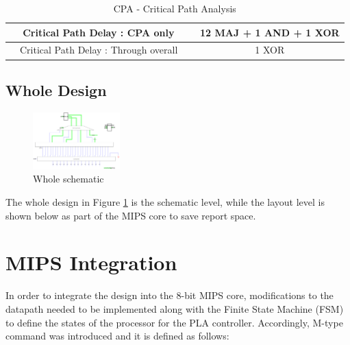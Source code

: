 \documentclass[journal]{IEEEtran}
\begin{document}
\vspace{-10pt}

\begin{table}[!h]
\renewcommand{\arraystretch}{1.5}
\caption{CPA - Critical Path Analysis}
\label{tab:t6}
\centering
\begin{tabular}{|c|c|}
\hline
~~Critical Path Delay : CPA only ~~ & 12 MAJ + 1 AND + 1 XOR\\\hline
~~Critical Path Delay : Through overall ~~ & 1 XOR\\\hline
\end{tabular}
\end{table}

\vspace{-10pt}


\subsection{Whole Design}

\begin{figure}[h!]
  \centering
  \includegraphics[width=0.3\textwidth]{9.png}
  \centering
  \caption{Whole schematic}
  \label{fig:9}
\end{figure}


The whole design in Figure \ref{fig:9} is the schematic level, while the layout level is shown below as part of the MIPS core to save report space.


\section{MIPS Integration}

In order to integrate the design into the 8-bit MIPS core, modifications to the datapath needed to be implemented along with the Finite State Machine (FSM) to define the states of the processor for the PLA controller. Accordingly, M-type command was introduced and it is defined as follows:
\end{document}

